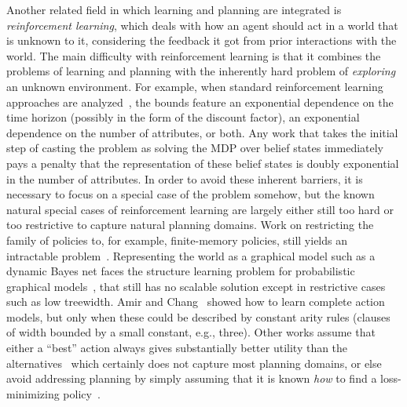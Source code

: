 \documentclass[12pt]{article}
\begin{document}
Another related field in which learning and planning are integrated is {\em reinforcement learning}, which deals with how an agent
should act in a world that is unknown to it, considering the feedback it got from prior interactions with the world. The main difficulty with reinforcement learning is that it combines the problems of learning and planning with the inherently hard problem of {\em exploring} an unknown environment. For example, when standard reinforcement learning approaches are analyzed~\cite{kearns2002POMDPsample,shani2005modelPOMDP}, the bounds feature an exponential dependence on the time horizon (possibly in the form of the discount factor), an exponential dependence on the number of attributes, or both. Any work that takes the initial step of casting the problem as solving the MDP over belief states immediately pays a penalty that the representation of these belief states is doubly exponential in the number of attributes.  In order to avoid these inherent barriers, it is necessary to focus on a special case of the problem somehow, but the known natural special cases of reinforcement learning are largely either still too hard or too restrictive to capture natural planning domains. Work on restricting the family of policies to, for example, finite-memory policies, still yields an intractable problem~\cite{meuleau1999finitestate}. Representing the world as a graphical model such as a dynamic Bayes net faces the structure learning problem for probabilistic graphical models~\cite[Section~19.4]{koller2009pgm}, that still has no scalable solution except in restrictive cases such as low treewidth. 
  Amir and Chang~\cite{amir2008} showed how to learn complete action models, but only when these could be described by constant arity rules (clauses of width bounded by a small constant, e.g., three).
  Other works assume that either a ``best'' action always gives substantially better utility than the alternatives~\cite{fern2006policyIteration} which certainly does not capture most planning domains, or else avoid addressing planning by simply assuming that it is known {\em how} to find a loss-minimizing policy~\cite{lazaric2010policyIteration}.


\end{document}
